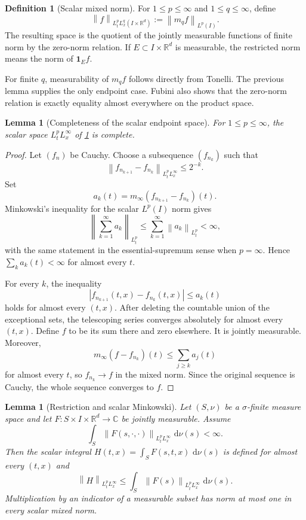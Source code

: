 \documentclass[11pt,oneside]{book}
\newtheorem{lemma}[theorem]{Lemma}
\theoremstyle{definition}
\newtheorem{definition}[theorem]{Definition}
\theoremstyle{remark}
\newcommand{\R}{\mathbb R}
\newcommand{\C}{\mathbb C}
\newcommand{\1}{\mathbf 1}
\newcommand{\dd}{\,\mathrm d}
\newcommand{\norm}[1]{\left\lVert #1\right\rVert}
\begin{document}
\begin{definition}[Scalar mixed norm]\label{def:scalar-mixed-norm}
For $1\le p\le\infty$ and $1\le q\le\infty$, define
\[
 \norm f_{L^p_tL^q_x(I\times\R^d)}
 :=\norm{m_qf}_{L^p(I)}.
\]
The resulting space is the quotient of the jointly measurable functions of
finite norm by the zero-norm relation.  If $E\subset I\times\R^d$ is
measurable, the restricted norm means the norm of $\1_Ef$.
\end{definition}

For finite $q$, measurability of $m_qf$ follows directly from Tonelli.  The
previous lemma supplies the only endpoint case.  Fubini also shows that the
zero-norm relation is exactly equality almost everywhere on the product
space.

\begin{lemma}[Completeness of the scalar endpoint space]
\label{lem:scalar-endpoint-complete}
For $1\le p\le\infty$, the scalar space $L^p_tL^\infty_x$ of
\cref{def:scalar-mixed-norm} is complete.
\end{lemma}

\begin{proof}
Let $(f_n)$ be Cauchy.  Choose a subsequence $(f_{n_k})$ such that
\[
 \norm{f_{n_{k+1}}-f_{n_k}}_{L^p_tL^\infty_x}\le2^{-k}.
\]
Set
\[
 a_k(t)=m_\infty(f_{n_{k+1}}-f_{n_k})(t).
\]
Minkowski's inequality for the scalar $L^p(I)$ norm gives
\[
 \norm{\sum_{k=1}^\infty a_k}_{L^p_t}
 \le\sum_{k=1}^\infty\norm{a_k}_{L^p_t}<\infty,
\]
with the same statement in the essential-supremum sense when $p=\infty$.
Hence $\sum_ka_k(t)<\infty$ for almost every $t$.

For every $k$, the inequality
\[
 |f_{n_{k+1}}(t,x)-f_{n_k}(t,x)|\le a_k(t)
\]
holds for almost every $(t,x)$.  After deleting the countable union of the
exceptional sets, the telescoping series converges absolutely for almost
every $(t,x)$.  Define $f$ to be its sum there and zero elsewhere.  It is
jointly measurable.  Moreover,
\[
 m_\infty(f-f_{n_k})(t)\le\sum_{j\ge k}a_j(t)
\]
for almost every $t$, so $f_{n_k}\to f$ in the mixed norm.  Since the
original sequence is Cauchy, the whole sequence converges to $f$.
\end{proof}

\begin{lemma}[Restriction and scalar Minkowski]
\label{lem:scalar-mixed-minkowski}
Let $(S,\nu)$ be a $\sigma$-finite measure space and let
$F:S\times I\times\R^d\to\C$ be jointly measurable.  Assume
\[
 \int_S\norm{F(s,\cdot,\cdot)}_{L^p_tL^\infty_x}\,\dd\nu(s)<\infty.
\]
Then the scalar integral $H(t,x)=\int_SF(s,t,x)\,\dd\nu(s)$ is defined for
almost every $(t,x)$ and
\begin{equation}
 \norm H_{L^p_tL^\infty_x}
 \le\int_S\norm{F(s)}_{L^p_tL^\infty_x}\,\dd\nu(s).
 \label{eq:scalar-minkowski-endpoint}
\end{equation}
Multiplication by an indicator of a measurable subset has norm at most one in
every scalar mixed norm.
\end{lemma}
\end{document}
